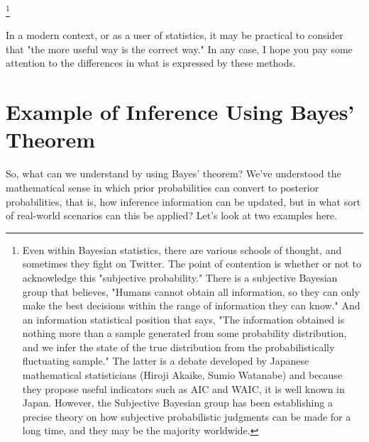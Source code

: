\documentclass{ltjsbook}
\begin{document}
\footnote{Even within Bayesian statistics, there are various schools of thought, and sometimes they fight on Twitter. The point of contention is whether or not to acknowledge this "subjective probability." There is a subjective Bayesian group that believes, "Humans cannot obtain all information, so they can only make the best decisions within the range of information they can know." And an information statistical position that says, "The information obtained is nothing more than a sample generated from some probability distribution, and we infer the state of the true distribution from the probabilistically fluctuating sample." The latter is a debate developed by Japanese mathematical statisticians (Hiroji Akaike, Sumio Watanabe) and because they propose useful indicators such as AIC and WAIC, it is well known in Japan. However, the Subjective Bayesian group has been establishing a precise theory on how subjective probabilistic judgments can be made for a long time, and they may be the majority worldwide.}

In a modern context, or as a user of statistics, it may be practical to consider that "the more useful way is the correct way." In any case, I hope you pay some attention to the differences in what is expressed by these methods.

\section{Example of Inference Using Bayes' Theorem}
So, what can we understand by using Bayes' theorem?
We've understood the mathematical sense in which prior probabilities can convert to posterior probabilities, that is, how inference information can be updated, but in what sort of real-world scenarios can this be applied?
Let's look at two examples here.

\end{document}
